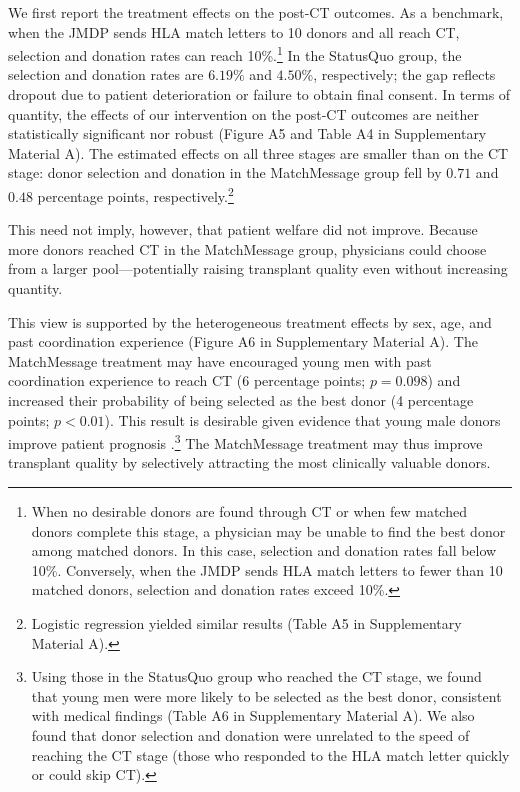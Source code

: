\documentclass[12pt, a4paper]{article}
\begin{document}
We first report the treatment effects on the post-CT outcomes. As a benchmark, when the JMDP sends HLA match letters to 10 donors and all reach CT, selection and donation rates can reach 10\%.\footnote{When no desirable donors are found through CT or when few matched donors complete this stage, a physician may be unable to find the best donor among matched donors. In this case, selection and donation rates fall below 10\%. Conversely, when the JMDP sends HLA match letters to fewer than 10 matched donors, selection and donation rates exceed 10\%.} In the StatusQuo group, the selection and donation rates are \(6.19\)\% and \(4.50\)\%, respectively; the gap reflects dropout due to patient deterioration or failure to obtain final consent. In terms of quantity, the effects of our intervention on the post-CT outcomes are neither statistically significant nor robust (Figure A5 and Table A4 in Supplementary Material A). The estimated effects on all three stages are smaller than on the CT stage: donor selection and donation in the MatchMessage group fell by \(0.71\) and \(0.48\) percentage points, respectively.\footnote{Logistic regression yielded similar results (Table A5 in Supplementary Material A).}

This need not imply, however, that patient welfare did not improve. Because more donors reached CT in the MatchMessage group, physicians could choose from a larger pool---potentially raising transplant quality even without increasing quantity.

This view is supported by the heterogeneous treatment effects by sex, age, and past coordination experience (Figure A6 in Supplementary Material A). The MatchMessage treatment may have encouraged young men with past coordination experience to reach CT (6 percentage points; \(p = 0.098\)) and increased their probability of being selected as the best donor (4 percentage points; \(p < 0.01\)). This result is desirable given evidence that young male donors improve patient prognosis \citep{Loren2006, Arai2016, Kollman2016, Shinohara2017}.\footnote{Using those in the StatusQuo group who reached the CT stage, we found that young men were more likely to be selected as the best donor, consistent with medical findings (Table A6 in Supplementary Material A). We also found that donor selection and donation were unrelated to the speed of reaching the CT stage (those who responded to the HLA match letter quickly or could skip CT).} The MatchMessage treatment may thus improve transplant quality by selectively attracting the most clinically valuable donors.
\end{document}
